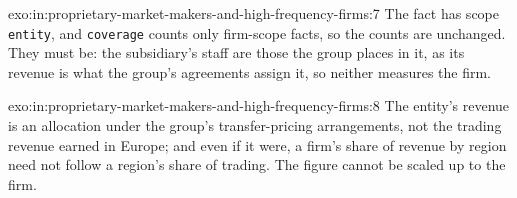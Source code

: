 \begin{solution}{exo:in:proprietary-market-makers-and-high-frequency-firms:7}
The fact has scope \texttt{entity}, and \texttt{coverage} counts only firm-scope facts, so the counts are unchanged. They
must be: the subsidiary's staff are those the group places in it, as its revenue is what the group's agreements assign
it, so neither measures the firm.
\end{solution}

\begin{solution}{exo:in:proprietary-market-makers-and-high-frequency-firms:8}
The entity's revenue is an allocation under the group's transfer-pricing arrangements, not the trading revenue earned in
Europe; and even if it were, a firm's share of revenue by region need not follow a region's share of trading. The
figure cannot be scaled up to the firm.
\end{solution}

